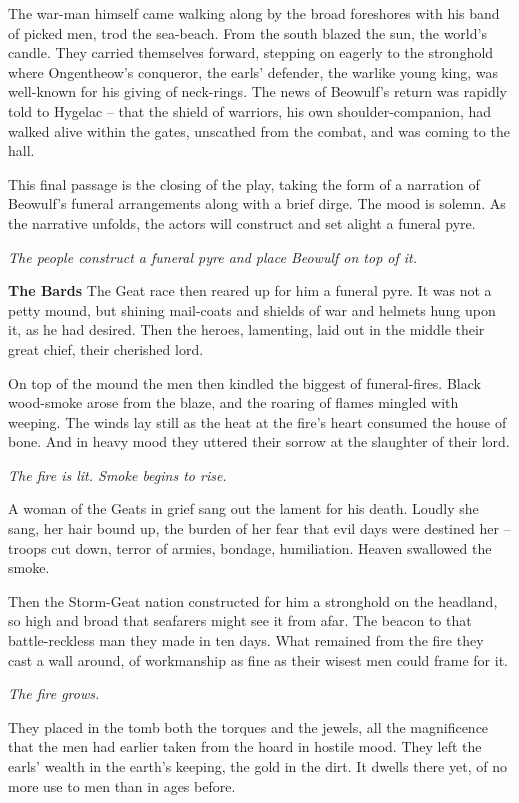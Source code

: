 \documentclass[a4paper]{article}
\begin{document}
{The war-man himself came walking along
by the broad foreshores with his band of picked men,
trod the sea-beach. From the south blazed
the sun, the world’s candle. They carried themselves forward,
stepping on eagerly to the stronghold where
Ongentheow’s conqueror, the earls’ defender,
the warlike young king, was well-known for his
giving of neck-rings. The news of Beowulf’s
return was rapidly told to Hygelac
– that the shield of warriors, his own shoulder-companion,
had walked alive within the gates,
unscathed from the combat, and was coming to the hall.

\centerline {This final passage is the closing of the play, taking the form of a narration of
Beowulf's funeral arrangements along with a brief dirge. The mood is solemn. As the narrative
unfolds, the actors will construct and set alight a funeral pyre.}

\centerline{\textit{The people construct a funeral pyre and place Beowulf on top of it.}}

\textbf{The Bards} The Geat race then reared up for him
a funeral pyre. It was not a petty mound,
but shining mail-coats and shields of war
and helmets hung upon it, as he had desired.
Then the heroes, lamenting, laid out in the middle
their great chief, their cherished lord.

On top of the mound the men then kindled
the biggest of funeral-fires. Black wood-smoke
arose from the blaze, and the roaring of flames
mingled with weeping. The winds lay still
as the heat at the fire’s heart consumed
the house of bone. And in heavy mood
they uttered their sorrow at the slaughter of their lord.

\centerline{\textit{The fire is lit. Smoke begins to rise.}}

A woman of the Geats in grief sang out
the lament for his death. Loudly she sang,
her hair bound up, the burden of her fear
that evil days were destined her
– troops cut down, terror of armies,
bondage, humiliation. Heaven swallowed the smoke.

Then the Storm-Geat nation constructed for him
a stronghold on the headland, so high and broad
that seafarers might see it from afar.
The beacon to that battle-reckless man
they made in ten days. What remained from the fire
they cast a wall around, of workmanship
as fine as their wisest men could frame for it.

\centerline{\textit{The fire grows.}}

They placed in the tomb both the torques and the jewels,
all the magnificence that the men had earlier
taken from the hoard in hostile mood.
They left the earls’ wealth in the earth’s keeping,
the gold in the dirt. It dwells there yet,
of no more use to men than in ages before.

}
\end{document}
